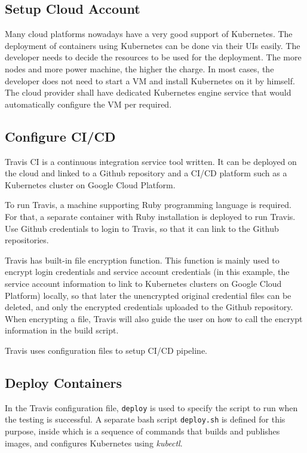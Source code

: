 \subsection{Setup Cloud Account}

Many cloud platforms nowadays have a very good support of Kubernetes. The deployment of containers using Kubernetes can be done via their UIs easily. The developer needs to decide the resources to be used for the deployment. The more nodes and more power machine, the higher the charge. In most cases, the developer does not need to start a VM and install Kubernetes on it by himself. The cloud provider shall have dedicated Kubernetes engine service that would automatically configure the VM per required.

\subsection{Configure CI/CD}

Travis CI is a continuous integration service tool written. It can be deployed on the cloud and linked to a Github repository and a CI/CD platform such as a Kubernetes cluster on Google Cloud Platform.

To run Travis, a machine supporting Ruby programming language is required. For that, a separate container with Ruby installation is deployed to run Travis. Use Github credentials to login to Travis, so that it can link to the Github repositories.

Travis has built-in file encryption function. This function is mainly used to encrypt login credentials and service account credentials (in this example, the service account information to link to Kubernetes clusters on Google Cloud Platform) locally, so that later the unencrypted original credential files can be deleted, and only the encrypted credentials uploaded to the Github repository. When encrypting a file, Travis will also guide the user on how to call the encrypt information in the build script.

Travis uses configuration files to setup CI/CD pipeline.

\subsection{Deploy Containers}

In the Travis configuration file, \verb|deploy| is used to specify the script to run when the testing is successful. A separate bash script \verb|deploy.sh| is defined for this purpose, inside which is a sequence of commands that builds and publishes images, and configures Kubernetes using \textit{kubectl}.

